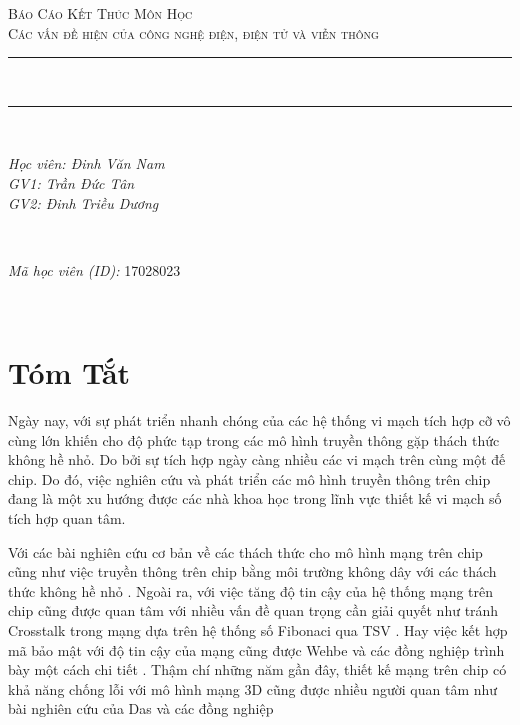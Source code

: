 \documentclass{article}
\date{\today}											%
\begin{document}

\begin{titlepage}
	\centering
	\vspace*{0.5 cm}
	\textsc{\LARGE Báo Cáo Kết Thúc Môn Học}\\[1.0 cm]	%
	\textsc{\Large Các vấn đề hiện  của công nghệ điện, điện tử và viễn thông}\\[0.5 cm]				%
	\rule{\linewidth}{0.2 mm} \\[0.4 cm]
	\rule{\linewidth}{0.2 mm} \\[1.5 cm]
	
	\begin{minipage}{0.5\textwidth}
		\begin{flushleft} \large
			\emph{Học viên: Đinh Văn Nam}\\
			\emph{GV1: Trần Đức Tân}\\
			\emph{GV2: Đinh Triều Dương}
		\end{flushleft}
	\end{minipage}~
	\begin{minipage}{0.5\textwidth}
		\begin{flushright} \large
			\emph{Mã học viên (ID):} 17028023									%
		\end{flushright}
	\end{minipage}\\[2 cm]
	\vfill
\end{titlepage}
	
	\tableofcontents
	\pagebreak
	

\section*{Tóm Tắt}
Ngày nay, với sự phát triển nhanh chóng của các hệ thống vi mạch tích hợp cỡ vô cùng lớn khiến cho độ phức tạp trong các mô hình truyền thông gặp thách thức không hề nhỏ. Do bởi sự tích hợp ngày càng nhiều các vi mạch trên cùng một đế chip. Do đó, việc nghiên cứu và phát triển các mô hình truyền thông trên chip đang là một xu hướng được các nhà khoa học trong lĩnh vực thiết kế vi mạch số tích hợp quan tâm.

Với các bài nghiên cứu cơ bản về các thách thức cho mô hình mạng trên chip \cite{7208160} cũng như việc truyền thông trên chip bằng môi trường không  dây với các thách thức không hề nhỏ \cite{6197727}. Ngoài ra, với việc tăng độ tin cậy của hệ thống mạng trên chip cũng được quan tâm với nhiều vấn đề quan trọng cần giải quyết như tránh Crosstalk trong mạng dựa trên hệ thống số Fibonaci qua TSV \cite{cui_enhancement_2017}.  Hay việc kết hợp mã bảo mật với độ tin cậy của mạng cũng được Wehbe và các đồng nghiệp trình bày một cách chi tiết \cite{wehbe_secure_2016}. Thậm chí những năm gần đây, thiết kế mạng trên chip có khả năng chống lỗi với mô hình mạng 3D cũng được nhiều người quan tâm như bài nghiên cứu của Das và các đồng nghiệp \cite{das_robust_2017}
\end{document}
